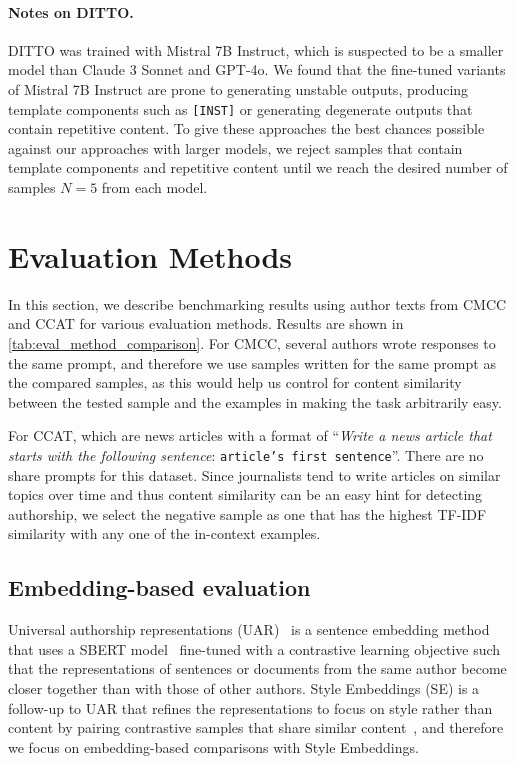 \paragraph{Notes on DITTO.} 
DITTO was trained with Mistral 7B Instruct, which is suspected to be a smaller model than Claude 3 Sonnet and GPT-4o. 
We found that the fine-tuned variants of Mistral 7B Instruct are prone to generating unstable outputs, producing template components such as \texttt{[INST]} or generating degenerate outputs that contain repetitive content. 
To give these approaches the best chances possible against our approaches with larger models, we reject samples that contain template components and repetitive content until we reach the desired number of samples $N=5$ from each model. 


\section{Evaluation Methods}
\label{appdx:automatic_evaluation}





In this section, we describe benchmarking results using author texts from CMCC and CCAT for various evaluation methods. 
Results are shown in \autoref{tab:eval_method_comparison}.
For CMCC, several authors wrote responses to the same prompt, and therefore we use samples written for the same prompt as the compared samples, as this would help us control for content similarity between the tested sample and the examples in making the task arbitrarily easy. 

For CCAT, which are news articles with a format of ``\textit{Write a news article that starts with the following sentence}: \texttt{article's first sentence}''. 
There are no share prompts for this dataset. 
Since journalists tend to write articles on similar topics over time and thus content similarity can be an easy hint for detecting authorship, we select the negative sample as one that has the highest TF-IDF similarity with any one of the in-context examples.

\subsection{Embedding-based evaluation}

Universal authorship representations (UAR)~\citep{rivera-soto-etal-2021-learning} is a sentence embedding method that uses a SBERT model~\cite{reimers-gurevych-2019-sentence} fine-tuned with a contrastive learning objective such that the representations of sentences or documents from the same author become closer together than with those of other authors.
Style Embeddings (SE) is a follow-up to UAR that refines the representations to focus on style rather than content by pairing contrastive samples that share similar content~\citep{wegmann-etal-2022-author}, and therefore we focus on embedding-based comparisons with Style Embeddings. 

